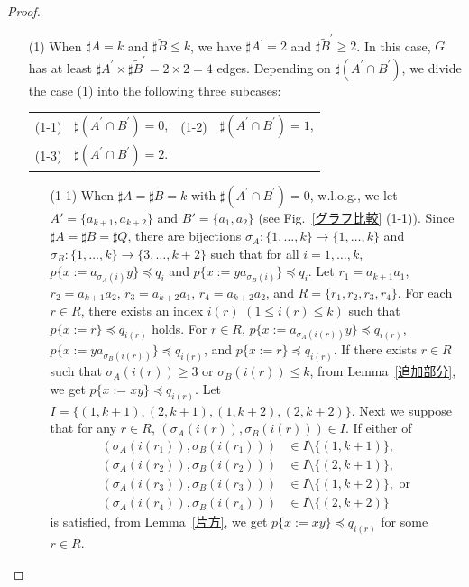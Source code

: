 \begin{proof}
\begin{enumerate}
\item[\textrm{(1)}] 
When $\sharp A=k$ and $\sharp \tilde{B} \le k$, we have $\sharp A^{\prime}=2$ and $\sharp \tilde{B}^{\prime} \ge 2$.
In this case, $G$ has at least $\sharp A^{\prime} \times \sharp \tilde{B}^{\prime}=2\times2=4$ edges.
Depending on $\sharp( A^{\prime} \cap B^{\prime} )$, we divide the case \textrm{(1)} into the following three subcases:
\smallskip

\begin{tabular}{llll}
\textrm{(1-1)} & $\sharp( A^{\prime} \cap B^{\prime} ) = 0$,&
\textrm{(1-2)} & $\sharp( A^{\prime} \cap B^{\prime} ) = 1$,\\
\textrm{(1-3)} & $\sharp( A^{\prime} \cap B^{\prime} ) = 2$.
\end{tabular}

\begin{enumerate}
\item[\textrm(1-1)]
When $\sharp A = \sharp \tilde{B} = k$ with $\sharp( A^{\prime} \cap B^{\prime} ) = 0$, w.l.o.g., we let $A'=\{a_{k+1},a_{k+2}\}$ and $B'=\{a_{1},a_{2}\}$ (see Fig.~\ref{グラフ比較} (1-1)).
Since $\sharp A = \sharp B = \sharp Q$, there are bijections $\sigma_{A} : \{1,\dots,k\} \rightarrow \{1,\dots,k\}$ and $\sigma_{B} : \{1,\dots,k\} \rightarrow \{3,\dots,k + 2\}$ such that for all $i = 1,\ldots,k$, $p \{ x:=a_{\sigma_{A}(i)}y \} \preceq q_{i}$ and $p \{ x:=ya_{\sigma_{B}(i)} \} \preceq q_{i}$.
Let $r_{1}=a_{k+1}a_{1}$, $r_{2}=a_{k+1}a_{2}$, $r_{3}=a_{k+2}a_{1}$, $r_{4}=a_{k+2}a_{2}$, and $R=\{r_{1}, r_{2}, r_{3}, r_{4}\}$.
For each $r \in R$, there exists an index $i(r)$ $(1\le i(r)\le k)$ such that $p \{x := r\} \preceq q_{i(r)}$ holds.
For $r\in R$, $p \{ x:=a_{\sigma_{A}(i(r))}y \} \preceq q_{i(r)}$, $p \{ x:=ya_{\sigma_{B}(i(r))} \} \preceq q_{i(r)}$, and $p \{ x:=r \} \preceq q_{i(r)}$.
If there exists $r\in R$ such that $\sigma_{A}(i(r)) \ge 3$ or $\sigma_{B}(i(r)) \le k$, from Lemma~\ref{追加部分}, we get $p \{x := xy\} \preceq q_{i(r)}$.
%
Let $I = \{(1, k + 1), (2, k + 1), (1, k + 2), (2, k + 2)\}$.
Next we suppose that for any $r\in R$, $(\sigma_{A}(i(r)), \sigma_{B}(i(r))) \in I$.
If either of
\begin{align*}
(\sigma_{A}(i(r_{1})), \sigma_{B}(i(r_{1}))) &\in I\setminus\{(1, k + 1)\},\\
(\sigma_{A}(i(r_{2})), \sigma_{B}(i(r_{2}))) &\in I\setminus\{(2, k + 1)\},\\
(\sigma_{A}(i(r_{3})), \sigma_{B}(i(r_{3}))) &\in I\setminus\{(1, k + 2)\},\mbox{~or}\\
(\sigma_{A}(i(r_{4})), \sigma_{B}(i(r_{4}))) &\in I\setminus\{(2, k + 2)\}
\end{align*}
is satisfied, from Lemma~\ref{片方}, we get $p \{x := xy\} \preceq q_{i(r)}$ for some $r\in R$.


\end{enumerate}
\end{enumerate}
\end{proof}
